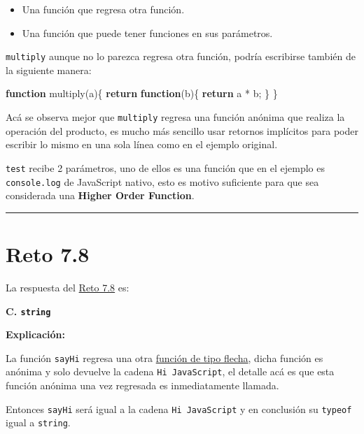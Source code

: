 \documentclass[
  letterpaper,
  DIV=11,
  numbers=noendperiod]{scrreprt}
\newenvironment{Shaded}{\begin{snugshade}}{\end{snugshade}}
\newcommand{\ControlFlowTok}[1]{\textcolor[rgb]{0.00,0.23,0.31}{\textbf{#1}}}
\newcommand{\FunctionTok}[1]{\textcolor[rgb]{0.28,0.35,0.67}{#1}}
\newcommand{\KeywordTok}[1]{\textcolor[rgb]{0.00,0.23,0.31}{\textbf{#1}}}
\newcommand{\NormalTok}[1]{\textcolor[rgb]{0.00,0.23,0.31}{#1}}
\newcommand{\OperatorTok}[1]{\textcolor[rgb]{0.37,0.37,0.37}{#1}}
\providecommand{\tightlist}{%
  \setlength{\itemsep}{0pt}\setlength{\parskip}{0pt}}
\begin{document}
\begin{itemize}
\tightlist
\item
  Una función que regresa otra función.
\item
  Una función que puede tener funciones en sus parámetros.
\end{itemize}

\texttt{multiply} aunque no lo parezca regresa otra función, podría
escribirse también de la siguiente manera:

\begin{Shaded}
\begin{Highlighting}[]
\KeywordTok{function} \FunctionTok{multiply}\NormalTok{(a)\{}
  \ControlFlowTok{return} \KeywordTok{function}\NormalTok{(b)\{}
    \ControlFlowTok{return}\NormalTok{ a }\OperatorTok{*}\NormalTok{ b}\OperatorTok{;}
\NormalTok{  \}}
\NormalTok{\}}
\end{Highlighting}
\end{Shaded}

Acá se observa mejor que \texttt{multiply} regresa una función anónima
que realiza la operación del producto, es mucho más sencillo usar
retornos implícitos para poder escribir lo mismo en una sola línea como
en el ejemplo original.

\texttt{test} recibe 2 parámetros, uno de ellos es una función que en el
ejemplo es \texttt{console.log} de JavaScript nativo, esto es motivo
suficiente para que sea considerada una \textbf{Higher Order Function}.

\begin{center}\rule{0.5\linewidth}{0.5pt}\end{center}

\section{Reto 7.8}\label{sec-sol-cap7-reto8}

La respuesta del \hyperref[sec-cap7-reto8]{Reto 7.8} es:

\textbf{C. \texttt{string}}

\textbf{Explicación:}

La función \texttt{sayHi} regresa una otra
\hyperref[glos-funcion_flecha]{función de tipo flecha}, dicha función es
anónima y solo devuelve la cadena \texttt{Hi\ JavaScript}, el detalle
acá es que esta función anónima una vez regresada es inmediatamente
llamada.

Entonces \texttt{sayHi} será igual a la cadena \texttt{Hi\ JavaScript} y
en conclusión su \texttt{typeof} igual a \texttt{string}.
\end{document}
